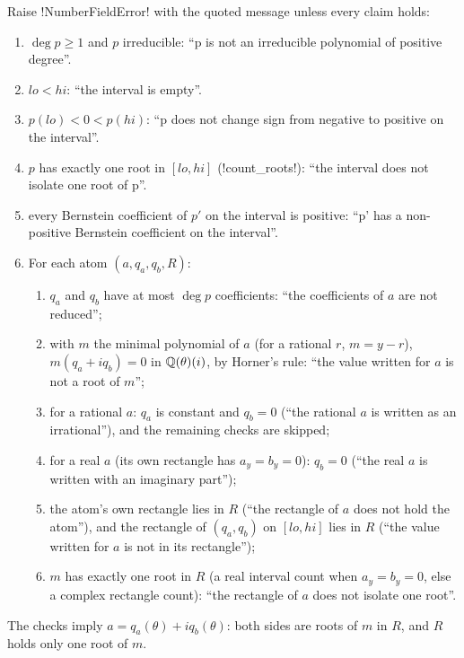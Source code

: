 \begin{algorithm}\label{alg:algebra-nf-check}
Raise \py!NumberFieldError! with the quoted message unless every claim holds:
\begin{enumerate}
\item $\deg p\ge 1$ and $p$ irreducible: ``p is not an irreducible polynomial of positive degree''.
\item $\mathit{lo}<\mathit{hi}$: ``the interval is empty''.
\item $p(\mathit{lo})<0<p(\mathit{hi})$: ``p does not change sign from negative to positive on the interval''.
\item $p$ has exactly one root in $[\mathit{lo},\mathit{hi}]$ (\py!count_roots!): ``the interval does not isolate one root of p''.
\item every Bernstein coefficient of $p'$ on the interval is positive: ``p' has a non-positive Bernstein coefficient on the interval''.
\item For each atom $(a,q_a,q_b,R)$:
\begin{enumerate}
\item $q_a$ and $q_b$ have at most $\deg p$ coefficients: ``the coefficients of $a$ are not reduced'';
\item with $m$ the minimal polynomial of $a$ (for a rational $r$, $m=y-r$), $m(q_a+iq_b)=0$ in $\mathbb{Q}(\theta)(i)$, by Horner's rule: ``the value written for $a$ is not a root of $m$'';
\item for a rational $a$: $q_a$ is constant and $q_b=0$ (``the rational $a$ is written as an irrational''), and the remaining checks are skipped;
\item for a real $a$ (its own rectangle has $a_y=b_y=0$): $q_b=0$ (``the real $a$ is written with an imaginary part'');
\item the atom's own rectangle lies in $R$ (``the rectangle of $a$ does not hold the atom''), and the rectangle of $(q_a,q_b)$ on $[\mathit{lo},\mathit{hi}]$ lies in $R$ (``the value written for $a$ is not in its rectangle'');
\item $m$ has exactly one root in $R$ (a real interval count when $a_y=b_y=0$, else a complex rectangle count): ``the rectangle of $a$ does not isolate one root''.
\end{enumerate}
\end{enumerate}
\end{algorithm}

The checks imply $a=q_a(\theta)+iq_b(\theta)$: both sides are roots of $m$ in $R$, and $R$ holds only one root of $m$.

